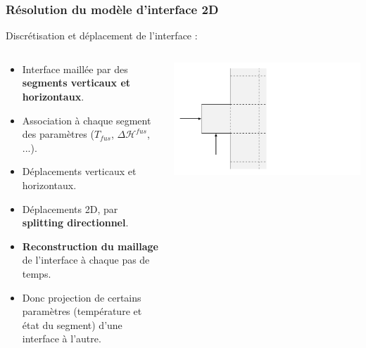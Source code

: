 \documentclass{beamer}
\begin{document}
\begin{frame}
    \frametitle{Résolution du modèle d'interface 2D}
    \footnotesize
	\begin{ceablock}{Discrétisation et déplacement de l'interface :}
	\begin{columns}[c]
	\begin{column}{0.7\textwidth}
	\begin{itemize}
		\item Interface maillée par des \textbf{segments verticaux et horizontaux}.\\
        \item Association à chaque segment des paramètres ($T_{fus}$, $\Delta \mathcal{H}^{fus}$, ...).\\
        \item Déplacements verticaux et horizontaux.\\
        \item Déplacements 2D, par \textbf{splitting directionnel}.\\
        \item \textbf{Reconstruction du maillage} de l'interface à chaque pas de temps.\\
        \item Donc projection de certains paramètres (température et état du segment) d'une interface à l'autre.
	\end{itemize}
	
	\end{column}
	\begin{column}{0.3\textwidth}
	\begin{center}
		\includegraphics[width=1.55\textwidth]{Figures/interface.pdf}
	\end{center}

	\end{column}

	\end{columns}
	\center {}
		\end{ceablock}
	\end{frame}
	
\end{document}
